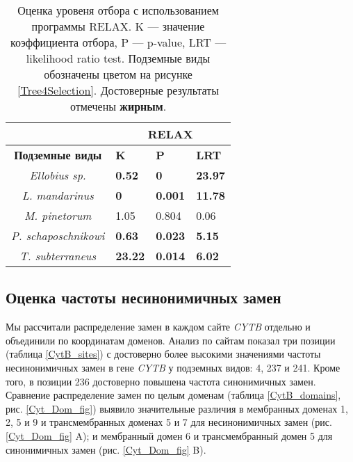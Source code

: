 \begin{table}[h!]
	\caption{Оценка уровеня отбора с использованием программы RELAX. K --- значение коэффициента отбора, P --- p-value, LRT --- likelihood ratio test. Подземные виды обозначены цветом на рисунке \ref{Tree4Selection}. Достоверные результаты отмечены \textbf{жирным}.}\label{Relax_cyt}
	\vspace{5mm}
	
\begin{center}
	\begin{tabular}{|c|l|l|l|}
		\hline
		\textbf{}                     & \multicolumn{3}{c|}{RELAX}              \\ \hline
		\textbf{Подземные виды} & \textbf{K}     & \textbf{P}     & \textbf{LRT}   \\ \hline
		\textit{Ellobius sp.}         & \textbf{0.52}  & \textbf{0}     & \textbf{23.97} \\ \hline
		\textit{L. mandarinus}        & \textbf{0}     & \textbf{0.001} & \textbf{11.78} \\ \hline
		\textit{M. pinetorum}         & 1.05           & 0.804          & 0.06           \\ \hline
		\textit{P. schaposchnikowi}   & \textbf{0.63}  & \textbf{0.023} & \textbf{5.15}  \\ \hline
		\textit{T. subterraneus}      & \textbf{23.22} & \textbf{0.014} & \textbf{6.02}  \\ \hline
	\end{tabular}
\end{center}
\end{table}

\subsection{Оценка частоты несинонимичных замен}

Мы рассчитали распределение замен в каждом сайте \textit{CYTB} отдельно и объединили по координатам доменов. Анализ по сайтам показал три позиции (таблица \ref{CytB_sites}) с достоверно более высокими значениями частоты несинонимичных замен в гене \textit{CYTB} у подземных видов: 4, 237 и 241. Кроме того, в позиции 236 достоверно повышена частота синонимичных замен. Сравнение распределение замен по целым доменам (таблица \ref{CytB_domains}, рис. \ref{Cyt_Dom_fig}) выявило значительные различия в мембранных доменах 1, 2, 5 и 9 и трансмембранных доменах 5 и 7 для несинонимичных замен (рис. \ref{Cyt_Dom_fig} A); и мембранный домен 6 и трансмембранный домен 5 для синонимичных замен (рис. \ref{Cyt_Dom_fig} B). 

